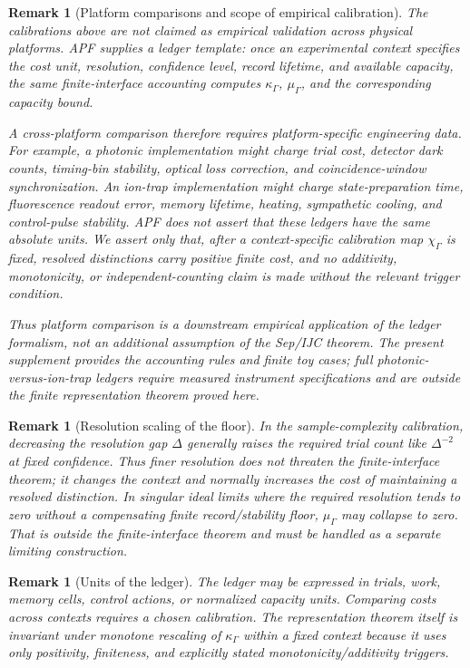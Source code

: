 \documentclass[11pt]{article}
\newtheorem{remark}[theorem]{Remark}
\begin{document}
\begin{remark}[Platform comparisons and scope of empirical calibration]\label{rem:platform-comparison-scope}
The calibrations above are not claimed as empirical validation across physical platforms.  APF supplies a ledger template: once an experimental context specifies the cost unit, resolution, confidence level, record lifetime, and available capacity, the same finite-interface accounting computes \(\kappa_\Gamma\), \(\mu_\Gamma\), and the corresponding capacity bound.

A cross-platform comparison therefore requires platform-specific engineering data.  For example, a photonic implementation might charge trial cost, detector dark counts, timing-bin stability, optical loss correction, and coincidence-window synchronization.  An ion-trap implementation might charge state-preparation time, fluorescence readout error, memory lifetime, heating, sympathetic cooling, and control-pulse stability.  APF does not assert that these ledgers have the same absolute units. We assert only that, after a context-specific calibration map \(\chi_\Gamma\) is fixed, resolved distinctions carry positive finite cost, and no additivity, monotonicity, or independent-counting claim is made without the relevant trigger condition.

Thus platform comparison is a downstream empirical application of the ledger formalism, not an additional assumption of the Sep/IJC theorem.  The present supplement provides the accounting rules and finite toy cases; full photonic-versus-ion-trap ledgers require measured instrument specifications and are outside the finite representation theorem proved here.
\end{remark}

\begin{remark}[Resolution scaling of the floor]
In the sample-complexity calibration, decreasing the resolution gap \(\Delta\) generally raises the required trial count like \(\Delta^{-2}\) at fixed confidence.  Thus finer resolution does not threaten the finite-interface theorem; it changes the context and normally increases the cost of maintaining a resolved distinction.  In singular ideal limits where the required resolution tends to zero without a compensating finite record/stability floor, \(\mu_\Gamma\) may collapse to zero.  That is outside the finite-interface theorem and must be handled as a separate limiting construction.
\end{remark}
\begin{remark}[Units of the ledger]
The ledger may be expressed in trials, work, memory cells, control actions, or normalized capacity units.  Comparing costs across contexts requires a chosen calibration.  The representation theorem itself is invariant under monotone rescaling of $\kappa_\Gamma$ within a fixed context because it uses only positivity, finiteness, and explicitly stated monotonicity/additivity triggers.
\end{remark}
\end{document}

